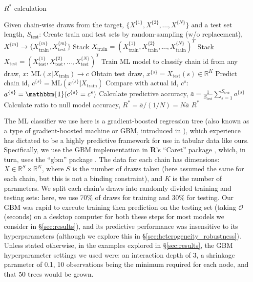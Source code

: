 \documentclass{article}
\begin{document}
\begin{algorithm}[tb]
	\caption{$R^*$ calculation}
	\label{alg:R_star}
	\begin{algorithmic}
		\STATE Given chain-wise draws from the target, $\{X^{\{1\}},X^{\{2\}},...,X^{\{N\}}\}$ and a test set length, $S_\text{test}$:
		\STATE Create train and test sets by random-sampling (w/o replacement), $X^{\{m\}}\rightarrow\{X^{\{m\}}_\text{train},X^{\{m\}}_\text{test}\}$
		\ENDFOR
		\STATE Stack $X_\text{train} = (X^{\{1\}}_\text{train},X^{\{2\}}_\text{train},...,X^{\{N\}}_\text{train})^T$
		\STATE Stack $X_\text{test} = (X^{\{1\}}_\text{test},X^{\{2\}}_\text{test},...,X^{\{N\}}_\text{test})^T$
		\STATE Train ML model to classify chain id from any draw, $x$: $\text{ML}(x|X_\text{train}) \rightarrow c$
		\STATE Obtain test draw, $x^{\{s\}}=X_\text{test}(s)\in \mathbb{R}^K$
		\STATE Predict chain id, $c^{\{s\}} = \text{ML}(x^{\{s\}}|X_\text{train})$
		\STATE Compare with actual id, $c^s$: $a^{\{s\}}=\mathbbm{1}(c^{\{s\}}=c^s)$
		\ENDFOR
		\STATE Calculate predictive accuracy, $\bar{a} = \frac{1}{S_\text{test}} \sum_{s=1}^{S_\text{test}} a^{\{s\}}$
		\STATE Calculate ratio to null model accuracy, $R^* = \bar{a} / (1 / N) = N \bar{a}$
		\RETURN $R^*$
	\end{algorithmic}
\end{algorithm}

The ML classifier we use here is a gradient-boosted regression tree (also known as a type of gradient-boosted machine or GBM, introduced in \cite{friedman2001greedy}), which experience has dictated to be a highly predictive framework for use in tabular data \citep{chollet2018} like ours. Specifically, we use the GBM implementation in \textbf{\textsf{R}}'s ``Caret'' package \citep{kuhn2008building}, which, in turn, uses the ``gbm'' package \citep{greenwell2019package}. The data for each chain has dimensions: $X\in \mathbb{R}^{S}\times \mathbb{R}^{K}$, where $S$ is the number of draws taken (here assumed the same for each chain, but this is not a binding constraint), and $K$ is the number of parameters. We split each chain's draws into randomly divided training and testing sets: here, we use 70\% of draws for training and 30\% for testing. Our GBM was rapid to execute training then prediction on the testing set (taking $\mathcal{O}$(seconds) on a desktop computer for both these steps for most models we consider in \S\ref{sec:results}), and its predictive performance was insensitive to its hyperparameters (although we explore this in \S\ref{sec:heterogeneity_robustness}). Unless stated otherwise, in the examples explored in \S\ref{sec:results}, the GBM hyperparameter settings we used were: an interaction depth of 3, a shrinkage parameter of 0.1, 10 observations being the minimum required for each node, and that 50 trees would be grown.
\end{document}
